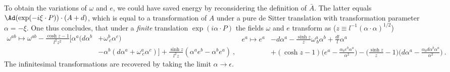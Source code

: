 \documentclass[11pt]{article}
\begin{document}
To obtain the variations of $\omega$ and $e$, we could have saved 
energy by reconsidering the definition of $\bar{A}$. The latter 
equals $\Ad(\exp(-i\xi\cdot P))\cdot(A + d)$, which is equal to a 
transformation of $A$ under a pure de Sitter translation with 
transformation parameter $\alpha = -\xi$. One thus concludes, 
that under a \emph{finite} translation $\exp(i\alpha\cdot P)$ the 
fields $\omega$ and $e$ transform as ($z \equiv l^{-1} (\alpha 
\cdot \alpha)^{1/2}$)
\begin{subequations}
	\label{eq:transvec_fin_omega}
\begin{equation}
\begin{split}
	\omega^{ab} \mapsto
		\omega^{ab} - \frac{\cosh z - 1}{l^2 z^2} \Big[\alpha^a 
		(d\alpha^b &+ \omega^b_{~c}\alpha^c) \\
		&- \alpha^b (d\alpha^a + \omega^a_{~c}\alpha^c) \Big] + 
		\frac{\sinh z}{l^2 z} (\alpha^a e^b - \alpha^b e^a)~,
\end{split}
\end{equation}
\begin{equation}
	\label{eq:transvec_fin_e}
\begin{split}
	e^a \mapsto
		e^a &- d\alpha^a - \frac{\sinh z}{z} \omega^a_{~b} \alpha^b 
		+ \frac{dl}{l}\alpha^a \\
		&+ (\cosh z -1) \bigg( e^a - \frac{\alpha_b e^b 
			\alpha^a}{\alpha^2} \bigg) - \Big(\frac{\sinh z}{z} - 
		1\Big) \bigg( d\alpha^a - \frac{\alpha_b d\alpha^b 
			\alpha^a}{\alpha^2} \bigg)~.
\end{split}
\end{equation}
\end{subequations}
The infinitesimal transformations are recovered by taking the 
limit $\alpha \to \epsilon$.
\end{document}
